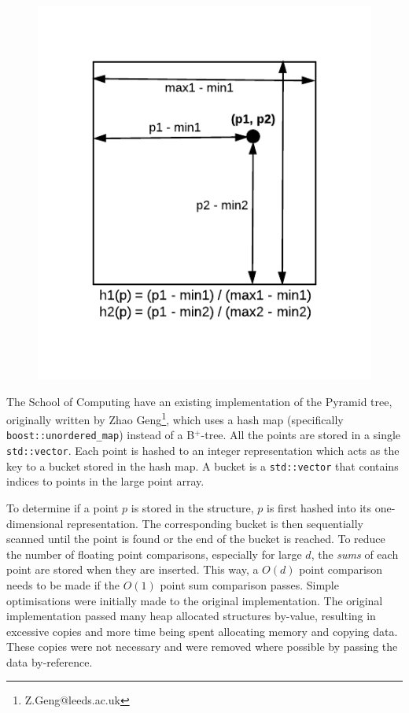 \begin{figure}
\begin{center}
			\begin{subfloat} {%
				\includegraphics[scale=0.6]{figures/pseudo-pyramid_tree_point_boundary_distances.pdf}
			}
			\end{subfloat}  
		\end{center}

		\label{fig:pyramid-tree-partition}
\end{figure}

The School of Computing have an existing implementation of the Pyramid tree, originally written by Zhao Geng\footnote{Z.Geng@leeds.ac.uk}, which uses a hash map (specifically \texttt{boost::unordered\_map}) instead of a B${}^{+}$-tree. All the points are stored in a single \texttt{std::vector}. Each point is hashed to an integer representation which acts as the key to a bucket stored in the hash map. A bucket is a \texttt{std::vector} that contains indices to points in the large point array.

To determine if a point $p$ is stored in the structure, $p$ is first hashed into its one-dimensional representation. The corresponding bucket is then sequentially scanned until the point is found or the end of the bucket is reached. To reduce the number of floating point comparisons, especially for large $d$, the \textit{sums} of each point are stored when they are inserted. This way, a $O(d)$ point comparison needs to be made if the $O(1)$ point sum comparison passes. Simple optimisations were initially made to the original implementation. The original implementation passed many heap allocated structures by-value, resulting in excessive copies and more time being spent allocating memory and copying data. These copies were not necessary and were removed where possible by passing the data by-reference.

